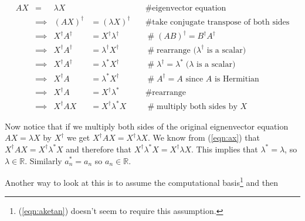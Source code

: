 \documentclass[11pt, oneside]{article}   	%
\begin{document}
\begin{equation}
\begin{array}{lclll}
A X
&=& \lambda X                                                                                               && \quad \mathrel{\#} \text{eigenvector equation} \\
&\implies& (A X)^{\dagger} &= (\lambda X)^{\dagger}                                      & \quad \mathrel{\#} \text{take conjugate transpose of both sides} \\
&\implies& X^{\dagger} A^\dagger&= X^{\dagger} \lambda^{\dagger}             & \quad \mathrel{\#} (AB)^\dagger = B^\dagger  A^\dagger \\
&\implies& X^{\dagger} A^\dagger &= \lambda^{\dagger} X^{\dagger}             & \quad \mathrel{\#} \text{rearrange ($\lambda^\dagger$ is a scalar)} \\
&\implies& X^{\dagger} A^\dagger &= \lambda^{*} X^{\dagger}                        & \quad \mathrel{\#} \lambda^\dagger = \lambda^* \; \text{($\lambda$ is a scalar)} \\
&\implies& X^{\dagger} A &= \lambda^{*} X^{\dagger}                                     & \quad \mathrel{\#} A^\dagger = A  \text{ since $A$ is Hermitian} \\
&\implies& X^{\dagger} A &= X^{\dagger}   \lambda^{*}                                   & \quad \mathrel{\#} \text{rearrange} \\
&\implies& X^\dagger  A X &= X^{\dagger}  \lambda^{*} X                               & \quad \mathrel{\#}  \text{multiply both sides by $X$}
\end{array}
\label{eqn:ax}
\end{equation}

\bigskip
\noindent
Now notice that if we multiply both sides of the original eignenvector equation $A X = \lambda X$ by $X^{\dagger}$ we get 
$X^{\dagger} AX = X^{\dagger} \lambda X$.  We know from (\ref{eqn:ax}) that $X^\dagger  A X = X^{\dagger}  \lambda^{*} X$
and therefore that $X^{\dagger}  \lambda^{*} X = X^{\dagger}  \lambda X $.
This implies that $\lambda^{*} = \lambda$, so $\lambda \in \mathbb{R}$.
Similarly $a_n^* = a_n$ so $a_n \in \mathbb{R}$.

\bigskip
\noindent
Another way to look at this is to assume the computational basis\footnote{(\ref{eqn:aketan}) doesn't seem to require this assumption.}
and then
\end{document}
